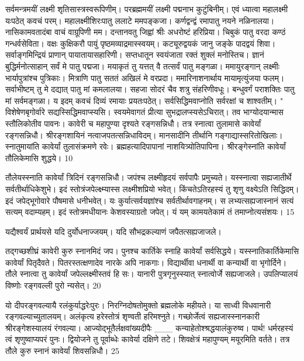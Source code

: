 सर्वमन्त्रमयीं लक्ष्मी शृतिसास्त्रस्वरूपिणीम्।
 परब्रह्ममयीं लक्ष्मी पद्मनाभ कुटुंबिनीम्।
 एवं ध्यात्वा महालक्ष्मी यःपठेत् कवचं परम्।
 महालक्ष्मीशिरःपातु ललाटे ममपङ्कजा।
 कर्णद्वन्द्वं रमापातु नयने नळिनालया।
 नासिकामवतादंबा वाचं वाग्रूपिणी मम।
 दन्तानवतु जिह्वां श्रीः अधरोष्टं हरिप्रिया।
 चिबुकं पातु वरदा कण्ठं गन्धर्वसेविता।
 वक्षः कुक्षिकरौ पायुं पृष्ठमव्याद्रमास्स्वयम्।
 कट्यूरुद्वयकं जानु जङ्के पादद्वयं शिवा।
 सर्वाङ्गमिन्द्रियं प्राणान् पायातायासहारिणी।
 सप्तधातून स्वयंजाता रक्तं शुक्लं मनोस्तिच।
 ज्ञानं बुद्धिर्मनोत्साहान् सर्वं मे पातु पद्मजा।
 मयाकृतं तु यत्तत् वै तत्सर्वं पातु मङ्गळा।
 ममायुरङ्गान् लक्ष्मीः भार्यापुत्रांश्च पुत्रिकाः।
 मित्राणि पातु सततं अखिलं मे वरप्रदा।
 ममारिनाशनार्थाय मायामृत्युंजया फलम्।
 सर्वाभीष्टम् तु मे दद्यात् पातु मां कमलालया।
 सहजा सोदरं चैव शत्रु संहरिणीवधूः।
 बन्धुवर्गं पराशक्तिः पातु मां सर्वमङ्गळा।
 य इदम् कवचं दिव्यं रमायाः प्रयतःपठेत्।
 सर्वसिद्धिमवाप्नोति सर्वरक्षां च शाश्वतीम्।
 "
विशेषेणबृगोर्वारे सद्यस्सिद्धिमवाप्स्यसि।
 स्वयमेवागतं प्रीत्या सुभद्रालप्स्यसेऽचिरात्।
 तव भाग्योदयान्मास स्तौलिकोतीव पावनः।
 कावेरी च महापुण्या दृश्यते रङ्गसन्निधौ।
 तत्र स्नात्वा तुलामासे कावेर्यां रङ्गसन्निधौ।
 श्रीरङ्गशायिनं नत्वाजपतत्सन्निधाविदम्।
 मानसादीनि तीर्थानि गङ्गाद्यास्सरितोखिलाः।
 स्नातुमायांति कावेर्यां तुलासंक्रमणे रवेः।
 ब्रह्महत्यादिपापानां नाशयित्र्योतिपापिना।
 श्रीरङ्गेस्नांति कावेर्यां तौलिकेमासि शुद्धये।
 10

  तौलेयस्स्नाति कावेर्यां त्रिदिनं रङ्गसन्निधौ।
 जपंश्च लक्ष्मीहृदयं सर्वपापैः प्रमुच्यते।
 यस्स्नात्वा सह्यजातीर्थे सर्वतीर्थाधिकेशुभे।
 इदं स्तोत्रंजपेल्क्ष्म्यास्स लक्ष्मीशप्रियो भवेत्।
 किंचतेऽतिरहस्यं तु शृणु वक्ष्येऽति सिद्धिदम्।
 इदं जपेद्भूगोवारे पौषमासे धनीभवेत्।
 यः कुर्यात्सर्वयज्ञांश्च सर्वतीर्थावगाहनम्।
 स लभ्यत्सह्यजास्नानं सत्यं सत्यम् वदाम्यहम्।
 इदं स्तोत्रमधीयानः केशवस्याग्रतो जपेत्।
 यं यम् कामयतेकामं तं तमाप्नोत्यसंशयः।
 15

  यद्यैश्वर्यं प्रार्थयसे यदि दुर्योधनाज्जयम्।
 यदि सौभद्रकल्याणं जपैतत्सह्यजाजले।
 
तद्गच्छशीघ्रं कावेरी कुरु स्नानमिदं जप।
 पुनश्च कार्तिके स्नाहि कावेर्यां सर्वसिद्धये।
 यस्स्नातिकार्तिकेमासि कावेर्यां पितृदैवते।
 पितरस्तत्क्षणादेव नारके अपि नाकगाः।
 विद्यार्थीवा धनार्थी वा कन्यार्थी वा भृगोर्दिने।
 तौले स्नात्वा तु कावेर्यां जपेल्लक्ष्मीस्तवं हि सः।
 यानारी पुत्रगृनुस्स्यात् स्नात्वोर्जे सह्यजाजले।
 उपलिप्यालयं विष्णोः रङ्गवल्ली पुरो न्यसेत्।
 20

  यो दीपरङ्गवल्यायै रलंकुर्याद्धरेःपुरः।
 निरग्निदोषतोमुक्तो ब्रह्मलोके महीयते।
 या साध्वी विधवानारी रङ्गवल्याच्युतालयम्।
 अलंकृत्य हरेस्तोत्रं शृण्वती हरिमश्नुते।
 गच्छोर्जेत्वं सह्यजास्स्नानकारी
श्रीरङ्गेशस्यालयं रंगवल्या।
 आज्योद्भूतैर्लक्षवांख्यदीपैः
___ कन्याहेतोश्श्रद्धयालंकुरुष्व।
 पार्थ! धर्मरहस्यं त्वं शृणुष्वाप्यपरं पुनः।
 द्वियोजने तु पूर्वाब्धेः कावेर्या दक्षिणे तटे।
 शिवक्षेत्रं महापुण्यम् मयूरमिति वर्तते।
 तत्र तौले कुरु स्नानं कावेर्यां शिवसन्निधौ।
 25

